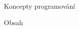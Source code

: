 \nopagenumbers

\tit Koncepty programování
\newpage

\nonum\notoc\sec Obsah
\maketoc
\newpage

\pagenumbers


